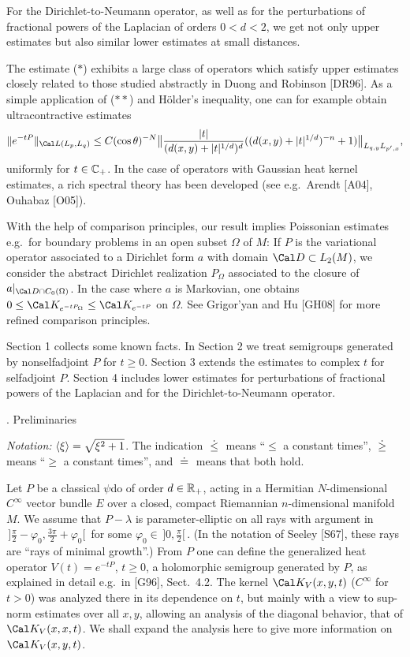 For the Dirichlet-to-Neumann operator, as well as for the perturbations of
fractional powers of the Laplacian of orders $0<d<2$, we get not only
upper estimates but also similar lower estimates at small distances.

The estimate ($*$) exhibits a large class of operators which satisfy
upper estimates closely related to those studied abstractly in Duong
and Robinson [DR96].
As a simple application of ($**$) and H\"o{}lder's inequality, one can for
example obtain ultracontractive estimates
$$
\|e^{-tP}\|_{\Cal L(L_p,L_q)}
\le C (\cos \theta )^{-N}\big\|\frac{|t|}{(d(x,y)+|t|^{1/d})^{d}}((d(x,y)+|t|^{1/d})^{-n}+1)\big\|_{L_{q,y}L_{p',x}},$$
 uniformly for $t\in{\Bbb C}_+$. In the case of operators with
Gaussian heat kernel estimates, a rich spectral theory has been
developed  (see e.g.\ Arendt [A04], Ouhabaz [O05]).


With the help of comparison principles, our result implies Poissonian
estimates e.g.\ for boundary problems in an open subset $\Omega$ of $M$: If $P$ is the
variational operator associated to a Dirichlet form $a$ with domain $\Cal
D\subset L_2(M)$, we consider the abstract Dirichlet realization
$P_\Omega$ associated to the closure of $a|_{\Cal D \cap C_0(\Omega)}$. In
the case where $a$ is Markovian, one obtains $0\leq \Cal
K_{e^{-tP_\Omega}} \leq \Cal K_{e^{-tP}}$ on $\Omega$. See Grigor'yan and
Hu [GH08] for more refined comparison principles.



\medskip

 Section 1 collects some known facts. In Section 2 we
treat semigroups generated by nonselfadjoint $P$ for $t\ge 0$. Section
3 extends the estimates to complex $t$ for selfadjoint $P$. Section 4
includes lower estimates for perturbations of fractional powers of the
Laplacian and for the Dirichlet-to-Neumann operator.


. Preliminaries \endhead

{\it Notation:} $\langle {\xi } \rangle=\sqrt{\xi ^2+1}$. The indication $\;\dot{\le}\;$ means ``$\le$ a
constant times'', $\;\dot{\ge}\;$ means  ``$\ge$ a
constant times'', and $\;\dot {=}\;$ means that both hold.

\medskip
Let $P$ be a classical $\psi
$do of order $d\in{\Bbb R}_+$, acting in a Hermitian $N$-dimensional
 $C^\infty $
vector bundle $E$ over a closed, compact
Riemannian $n$-dimensional manifold $M$.
We assume that $P-\lambda $ is
parameter-elliptic on all rays with argument in $\,]\frac\pi 2-\varphi
_0, \frac{3\pi }2+\varphi _0 [\,$ for some $\varphi _0\in
\,]0,\frac\pi 2[\,$. (In the notation of Seeley [S67], these rays are
``rays of minimal growth''.)
From $P$ one can define the generalized heat operator $V(t)=e^{-tP}$,
$t\ge 0$, a holomorphic semigroup generated by $P$, as explained in
detail e.g.\ in [G96], Sect.\ 4.2.
The kernel $\Cal
K_{V}(x,y,t)$ ($C^\infty $ for $t>0$)
was analyzed there in its dependence on $t$, but mainly with a view
to sup-norm estimates over all $x,y$, allowing an analysis of the
diagonal behavior, that of $\Cal K_{V}(x,x,t)$. We shall expand the
analysis here to give more information on $\Cal K_{V}(x,y,t)$.
\medskip

